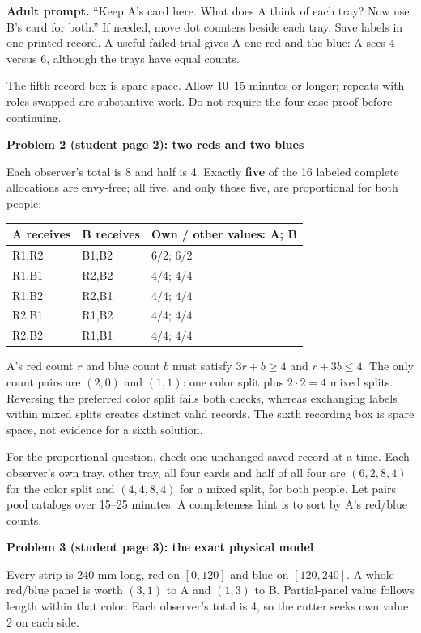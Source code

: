 \documentclass[11pt]{article}
\newcommand{\heading}[1]{\par\vspace{1.5mm}{\large\bfseries #1}\par\vspace{.8mm}}
\newcommand{\subhead}[1]{\par\vspace{1mm}\textbf{#1}\par}
\newcommand{\adult}[1]{\textbf{Adult prompt.} #1\par}
\newcommand{\page}[1]{\newpage\heading{#1}}
\begin{document}
\adult{``Keep A's card here. What does A think of each tray? Now use B's card for both.'' If needed, move dot counters beside each tray. Save labels in one printed record. A useful failed trial gives A one red and the blue: A sees 4 versus 6, although the trays have equal counts.}

The fifth record box is spare space. Allow 10--15 minutes or longer; repeats with roles swapped are substantive work. Do not require the four-case proof before continuing.

\subhead{Problem 2 (student page 2): two reds and two blues}
Each observer's total is 8 and half is 4. Exactly \textbf{five} of the 16 labeled complete allocations are envy-free; all five, and only those five, are proportional for both people:

\begin{tabularx}{\linewidth}{@{}L{31mm}L{33mm}X@{}}\toprule
A receives & B receives & Own / other values: A; B\\\midrule
R1,R2 & B1,B2 & $6/2$; $6/2$\\
R1,B1 & R2,B2 & $4/4$; $4/4$\\
R1,B2 & R2,B1 & $4/4$; $4/4$\\
R2,B1 & R1,B2 & $4/4$; $4/4$\\
R2,B2 & R1,B1 & $4/4$; $4/4$\\\bottomrule
\end{tabularx}

A's red count $r$ and blue count $b$ must satisfy $3r+b\ge4$ and $r+3b\le4$. The only count pairs are $(2,0)$ and $(1,1)$: one color split plus $2\cdot2=4$ mixed splits. Reversing the preferred color split fails both checks, whereas exchanging labels within mixed splits creates distinct valid records. The sixth recording box is spare space, not evidence for a sixth solution.

For the proportional question, check one unchanged saved record at a time. Each observer's own tray, other tray, all four cards and half of all four are $(6,2,8,4)$ for the color split and $(4,4,8,4)$ for a mixed split, for both people. Let pairs pool catalogs over 15--25 minutes. A completeness hint is to sort by A's red/blue counts.

\page{Problems 3 and 4: cutting, choice and guarantee}
\subhead{Problem 3 (student page 3): the exact physical model}
Every strip is 240 mm long, red on $[0,120]$ and blue on $[120,240]$. A whole red/blue panel is worth $(3,1)$ to A and $(1,3)$ to B. Partial-panel value follows length within that color. Each observer's total is 4, so the cutter seeks own value 2 on each side.
\end{document}
